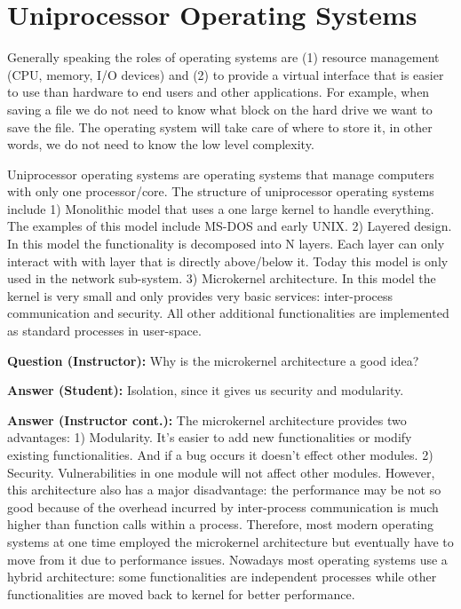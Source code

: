 \documentclass[twoside]{article}
\begin{document}
\section{Uniprocessor Operating Systems}
Generally speaking the roles of operating systems are (1) resource management (CPU, memory, I/O devices) and (2) to provide a virtual interface that is easier to use than hardware to end users and other applications. For example, when saving a file we do not need to know what block on the hard drive we want to save the file. The operating system will take care of where to store it, in other words, we do not need to know the low level complexity. 

Uniprocessor operating systems are operating systems that manage computers with only one processor/core. The structure of uniprocessor operating systems include 1) Monolithic model that uses a one large kernel to handle everything. The examples of this model include MS-DOS and early UNIX. 2) Layered design. In this model the functionality is decomposed into N layers. Each layer can only interact with with layer that is directly above/below it. Today this model is only used in the network sub-system. 3) Microkernel architecture. In this model the kernel is very small and only provides very basic services: inter-process communication and security. All other additional functionalities are implemented as standard processes in user-space.

\textbf{Question (Instructor):} Why is the microkernel architecture a good idea?

\textbf{Answer (Student):} Isolation, since it gives us security and modularity.

\textbf{Answer (Instructor cont.):} The microkernel architecture provides two advantages: 1) Modularity. It's easier to add new functionalities or modify existing functionalities. And if a bug occurs it doesn't effect other modules. 2) Security. Vulnerabilities in one module will not affect other modules. However, this architecture also has a major disadvantage: the performance may be not so good because of the overhead incurred by inter-process communication is much higher than function calls within a process. Therefore, most modern operating systems at one time employed the microkernel architecture but eventually have to move from it due to performance issues. Nowadays most operating systems use a hybrid architecture: some functionalities are independent processes while other functionalities are moved back to kernel for better performance. 
\end{document}
